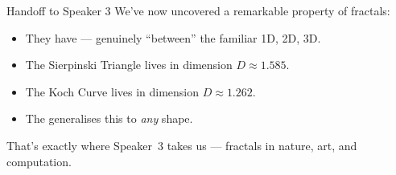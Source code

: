 \begin{frame}{Handoff to Speaker 3}
  \small
  We've now uncovered a remarkable property of fractals:

  \begin{itemize}
    \item They have  ---
      genuinely ``between'' the familiar 1D, 2D, 3D.
    \item The Sierpinski Triangle lives in dimension
      $D\approx 1.585$.
    \item The Koch Curve lives in dimension
      $D\approx 1.262$.
    \item The  generalises
      this to \emph{any} shape.
  \end{itemize}

  \pause
  \vspace{0.3cm}
  \begin{center}
  \end{center}

  \vspace{0.2cm}
  \pause
  That's exactly where Speaker~3 takes us ---
  fractals in nature, art, and computation.
\end{frame}


